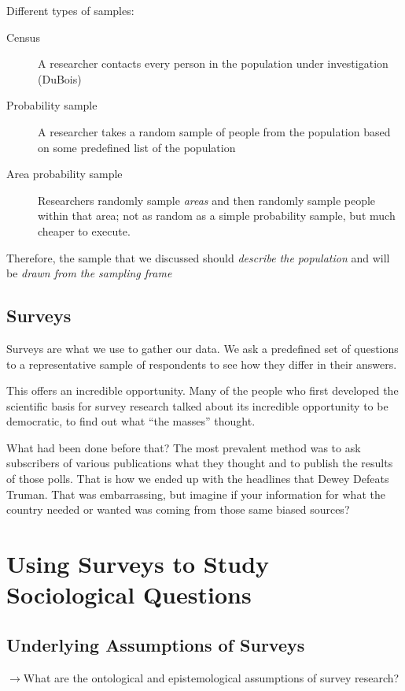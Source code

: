 \documentclass[11pt]{lecturenotes}
\begin{document}
\slide
Different types of samples: 
\begin{description}
\item[Census] A researcher contacts every person in the population under investigation (DuBois)
\item[Probability sample] A researcher takes a random sample of people from the population based on some predefined list of the population
\item[Area probability sample] Researchers randomly sample \emph{areas} and then randomly sample people within that area; not as random as a simple probability sample, but much cheaper to execute. 
\end{description}

\slide
{}

\slide
{}

\slide
Therefore, the sample that we discussed should \emph{describe the population} and will be \emph{drawn from the sampling frame}

\subsection[5]{Surveys}
Surveys are what we use to gather our data. We ask a predefined set of questions to a representative sample of respondents to see how they differ in their answers. 

This offers an incredible opportunity. Many of the people who first developed the scientific basis for survey research talked about its incredible opportunity to be democratic, to find out what ``the masses'' thought. 


\slide
What had been done before that? The most prevalent method was to ask subscribers of various publications what they thought and to publish the results of those polls. That is how we ended up with the headlines that Dewey Defeats Truman. That was embarrassing, but imagine if your information for what the country needed or wanted was coming from those same biased sources? 


\section{Using Surveys to Study Sociological Questions}
\subsection[10]{Underlying Assumptions of Surveys}
\slide
$\rightarrow$What are the ontological and epistemological assumptions of survey research? 
\end{document}
